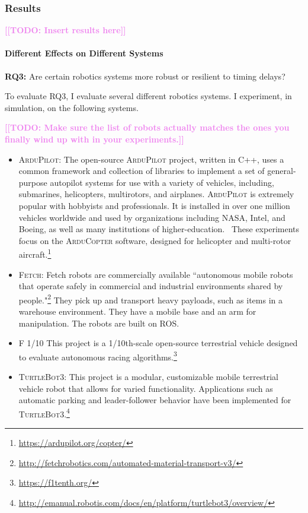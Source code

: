 \documentclass[conference]{IEEEtran}
\newcommand{\todo}[1]{\textcolor{violet}{{\bfseries [[TODO: #1]]}}}
\newcommand{\tool}[1]{\textsc{#1}}
\begin{document}
\subsubsection{Results}
\todo{Insert results here}

\paragraph{Different Effects on Different Systems}
\textbf{RQ3:} Are certain robotics systems more robust or resilient to timing delays?

To evaluate RQ3, I evaluate several different robotics systems. I experiment, in simulation, on the following systems.

\todo{Make sure the list of robots actually matches the ones you finally wind up with in your experiments.}
\begin{itemize}

\item{\tool{ArduPilot}:} The open-source \tool{ArduPilot}
project, written in C++, uses a common framework and
collection of libraries to implement a set of general-purpose
autopilot systems for use with a variety of vehicles, including,
submarines, helicopters, multirotors, and
airplanes. \tool{ArduPilot} is extremely popular with hobbyists
and professionals. It is installed in over one million vehicles
worldwide and used by organizations including NASA,
Intel, and Boeing, as well as many institutions of higher-education.~\cite{TimperleyArdu2018}
These experiments focus on the \tool{ArduCopter} software, designed for
helicopter and multi-rotor aircraft.\footnote{\url{https://ardupilot.org/copter/}}

\item{\tool{Fetch}:} Fetch robots are commercially available ``autonomous mobile robots that operate
safely in commercial and industrial environments shared by
people."\footnote{\url{http://fetchrobotics.com/automated-material-transport-v3/}}
They pick up and transport heavy payloads, such as items in a warehouse environment.
They have a mobile base and an arm for manipulation.
The robots are built on \ac{ROS}.



\item{\tool{F 1/10}} This project is a 1/10th-scale open-source terrestrial vehicle designed to evaluate autonomous racing algorithms.\footnote{\url{https://f1tenth.org/}}

\item{\tool{TurtleBot3}:} This project is a modular, customizable mobile terrestrial vehicle robot that allows for varied functionality. Applications such as automatic parking and leader-follower behavior have been implemented for \tool{TurtleBot3}.\footnote{\url{http://emanual.robotis.com/docs/en/platform/turtlebot3/overview/}}


\end{itemize}
\end{document}
